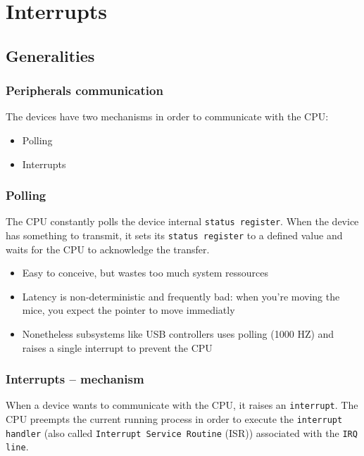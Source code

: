 \documentclass{beamer}
\begin{document}
\section{Interrupts}

\subsection{Generalities}

\begin{frame}
  \frametitle{Peripherals communication}

  The devices have two mechanisms in order to communicate with the CPU:\\
  \begin{itemize}
  \item
    Polling
  \item
    Interrupts
  \end{itemize}
\end{frame}

\begin{frame}
  \frametitle{Polling}

  The CPU constantly polls the device internal \texttt{status register}. When the device has something to transmit, it sets its \texttt{status register} to a defined value and waits for the CPU to acknowledge the transfer.\\
  \begin{itemize}
  \item
    Easy to conceive, but wastes too much system ressources
  \item
    Latency is non-deterministic and frequently bad: when you're moving the mice, you expect the pointer to move immediatly
  \item
    Nonetheless subsystems like USB controllers uses polling (1000 HZ) and raises a single interrupt to prevent the CPU
  \end{itemize}
\end{frame}

\begin{frame}
  \frametitle{Interrupts -- mechanism}

  When a device wants to communicate with the CPU, it raises an \texttt{interrupt}. The CPU preempts the current running process in order to execute the \texttt{interrupt handler} (also called \texttt{Interrupt Service Routine} (ISR)) associated with the \texttt{IRQ line}.\\
\end{frame}
\end{document}
